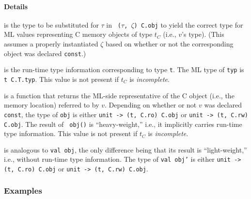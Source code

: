 \documentclass[titlepage,letterpaper]{article}
\begin{document}
\paragraph*{Details}

\begin{description}\setlength{\itemsep}{0pt}
\item[{\tt type t}] is the type to be substituted for $\tau$ in {\tt
    ($\tau$, $\zeta$) C.obj} to yield the correct type for ML values
  representing C memory objects of type $t_C$ (i.e., $v$'s type).
  (This assumes a properly instantiated $\zeta$ based on whether or
  not the corresponding object was declared {\tt const}.)
\item[!{\tt val typ}] is the run-time type information corresponding
  to type {\tt t}.  The ML type of {\tt typ} is {\tt t C.T.typ}.  This
  value is not present if $t_C$ is {\em incomplete}.
\item[!{\tt val obj}] is a function that returns the ML-side
  representative of the C object (i.e., the memory location) referred
  to by $v$.  Depending on whether or not $v$ was declared {\tt
    const}, the type of {\tt obj} is either {\tt unit -> (t, C.ro)
    C.obj} or {\tt unit -> (t, C.rw) C.obj}.  The result of {\tt
    obj()} is ``heavy-weight,'' i.e., it implicitly carries run-time
  type information.  This value is not present if $t_C$ is {\em
    incomplete}.
\item[{\tt val obj'}] is analogous to {\tt val obj}, the only
  difference being that its result is ``light-weight,'' i.e., without
  run-time type information.  The type of {\tt val obj'} is
  either {\tt unit -> (t, C.ro) C.obj} or {\tt unit -> (t, C.rw) C.obj}.
\end{description}

\subsubsection*{Examples}
\end{document}
